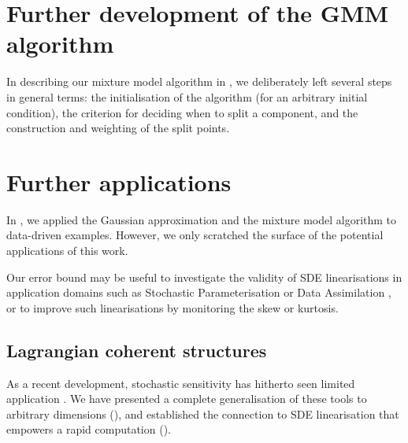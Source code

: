 \section{Further development of the GMM algorithm}\label{sec:gmm_extensions}
In describing our mixture model algorithm in , we deliberately left several steps in general terms: the initialisation of the algorithm (for an arbitrary initial condition), the criterion for deciding when to split a component, and the construction and weighting of the split points.



\section{Further applications}
In , we applied the Gaussian approximation and the mixture model algorithm to data-driven examples.
However, we only scratched the surface of the potential applications of this work.

Our error bound may be useful to investigate the validity of SDE linearisations in application domains such as Stochastic Parameterisation \citep{BernerEtAl_2017_StochasticParameterizationNew,Palmer_2019_StochasticWeatherClimate,LeutbecherEtAl_2017_StochasticRepresentationsModel} or Data Assimilation \citep{BudhirajaEtAl_2019_AssimilatingDataModels,ReichCotter_2015_ProbabilisticForecastingBayesian,LawEtAl_2015_DataAssimilationMathematical}, or to improve such linearisations by monitoring the skew or kurtosis.


\subsection{Lagrangian coherent structures}

As a recent development, stochastic sensitivity has hitherto seen limited application \citep{BadzaEtAl_2023_HowSensitiveAre,Balasuriya_2020_UncertaintyFinitetimeLyapunov,FangEtAl_2020_DisentanglingResolutionPrecision}.
We have presented a complete generalisation of these tools to arbitrary dimensions (), and established the connection to SDE linearisation that empowers a rapid computation ().

